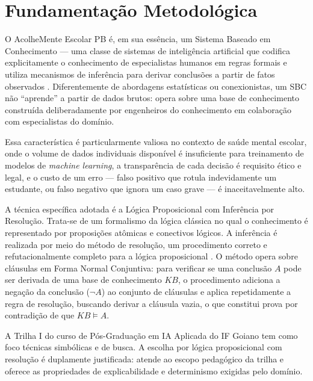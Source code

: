 \documentclass[
    12pt,
    openright,
    oneside,
    a4paper,
    english,
    brazil
]{abntex2}
\begin{document}
\chapter{Fundamentação Metodológica}

O AcolheMente Escolar PB é, em sua essência, um Sistema Baseado em Conhecimento --- uma classe de sistemas de inteligência artificial que codifica explicitamente o conhecimento de especialistas humanos em regras formais e utiliza mecanismos de inferência para derivar conclusões a partir de fatos observados \cite{brachman_levesque_2004}. Diferentemente de abordagens estatísticas ou conexionistas, um SBC não ``aprende'' a partir de dados brutos: opera sobre uma base de conhecimento construída deliberadamente por engenheiros do conhecimento em colaboração com especialistas do domínio.

Essa característica é particularmente valiosa no contexto de saúde mental escolar, onde o volume de dados individuais disponível é insuficiente para treinamento de modelos de \textit{machine learning}, a transparência de cada decisão é requisito ético e legal, e o custo de um erro --- falso positivo que rotula indevidamente um estudante, ou falso negativo que ignora um caso grave --- é inaceitavelmente alto.

A técnica específica adotada é a Lógica Proposicional com Inferência por Resolução. Trata-se de um formalismo da lógica clássica no qual o conhecimento é representado por proposições atômicas e conectivos lógicos. A inferência é realizada por meio do método de resolução, um procedimento correto e refutacionalmente completo para a lógica proposicional \cite{genesereth_nilsson_1987}. O método opera sobre cláusulas em Forma Normal Conjuntiva: para verificar se uma conclusão $A$ pode ser derivada de uma base de conhecimento $KB$, o procedimento adiciona a negação da conclusão ($\neg A$) ao conjunto de cláusulas e aplica repetidamente a regra de resolução, buscando derivar a cláusula vazia, o que constitui prova por contradição de que $KB \models A$.

A Trilha I do curso de Pós-Graduação em IA Aplicada do IF Goiano tem como foco técnicas simbólicas e de busca. A escolha por lógica proposicional com resolução é duplamente justificada: atende ao escopo pedagógico da trilha e oferece as propriedades de explicabilidade e determinismo exigidas pelo domínio.
\end{document}
